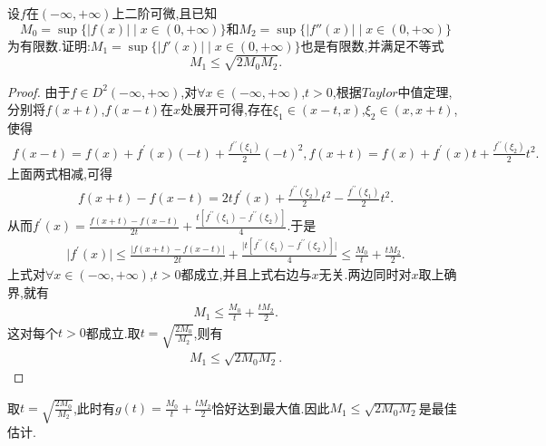 \documentclass[lang=cn,newtx,10pt,scheme=chinese]{../Template/elegantbook}
\begin{document}
\begin{example}\label{example:1.1(由原函数和二阶导数上确界估计一阶导数上确界)(区间为R)}
    设\(f\)在\((-\infty,+\infty)\)上二阶可微,且已知
    \begin{equation}
    M_0=\sup\{\vert f(x)\vert\mid x\in(0,+\infty)\}\text{和}M_2=\sup\{\vert f''(x)\vert\mid x\in(0,+\infty)\}
        \nonumber
    \end{equation}
    为有限数.证明:\(M_1=\sup\{\vert f'(x)\vert\mid x\in(0,+\infty)\}\)也是有限数,并满足不等式
    \begin{equation}
        M_1\leqslant \sqrt{2M_0M_2}.
        \nonumber
    \end{equation}
\end{example}
\begin{proof}
    由于\(f\in D^2(-\infty,+\infty)\),对\(\forall x\in (-\infty,+\infty)\),\(t > 0\),根据\(Taylor\)中值定理,分别将\(f(x + t)\),\(f(x - t)\)在\(x\)处展开可得,存在\(\xi_1\in (x - t,x)\),\(\xi_2\in (x,x + t)\),使得
    \begin{align*}
    f(x - t) = f(x) + f^{\prime}(x)(-t) + \frac{f^{\prime\prime}(\xi_1)}{2}(-t)^2,
f(x + t) = f(x) + f^{\prime}(x)t + \frac{f^{\prime\prime}(\xi_2)}{2}t^2.
    \end{align*}
上面两式相减,可得
\begin{align*}
   f(x + t) - f(x - t) = 2tf^{\prime}(x) + \frac{f^{\prime\prime}(\xi_2)}{2}t^2 - \frac{f^{\prime\prime}(\xi_1)}{2}t^2.
\end{align*}
从而\(f^{\prime}(x) = \frac{f(x + t) - f(x - t)}{2t} + \frac{t[f^{\prime\prime}(\xi_1) - f^{\prime\prime}(\xi_2)]}{4}\).于是
\begin{align*}
    \vert f^{\prime}(x)\vert\leqslant \frac{\vert f(x + t) - f(x - t)\vert}{2t} + \frac{\vert t[f^{\prime\prime}(\xi_1) - f^{\prime\prime}(\xi_2)]\vert}{4}\leqslant \frac{M_0}{t} + \frac{tM_2}{2}.
\end{align*}
上式对\(\forall x\in (-\infty,+\infty)\),\(t > 0\)都成立,并且上式右边与\(x\)无关.两边同时对\(x\)取上确界,就有
\begin{align*}
    M_1\leqslant \frac{M_0}{t} + \frac{tM_2}{2}.
\end{align*}
这对每个\(t > 0\)都成立.取\(t = \sqrt{\frac{2M_0}{M_2}}\),则有
\begin{align*}
    M_1\leqslant \sqrt{2M_0M_2}.
\end{align*} 

\end{proof}
\begin{remark}
    取\(t = \sqrt{\frac{2M_0}{M_2}}\),此时有\(g(t) = \frac{M_0}{t} + \frac{tM_2}{2}\)恰好达到最大值.因此\(M_1\leqslant \sqrt{2M_0M_2}\)是最佳估计.
\end{remark}
\end{document}
